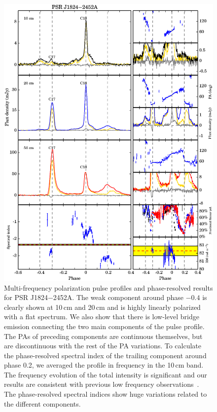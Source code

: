 \documentclass[useAMS,usenatbib]{mn2e}
\begin{document}
\begin{appendix}
\begin{figure}
\begin{center}
\includegraphics[width=6 in]{1824.ps}
\caption{Multi-frequency polarization pulse profiles and phase-resolved results for PSR J1824$-$2452A. 
The weak component around phase $-0.4$ is clearly shown at 10\,cm and 20\,cm and is highly 
linearly polarized with a flat spectrum. 
%
We also show that there is low-level bridge emission 
connecting the two main components of the pulse profile.
%
The PAs of preceding components are continuous themselves, but are 
discontinuous with the rest of the PA variations.
%
To calculate the phase-resolved spectral index of the trailing component
around phase 0.2, we averaged the profile in frequency in the 10\,cm 
band.
%
The frequency evolution of the total intensity is significant and 
our results are consistent with previous low frequency observations~\citep[e.g.,][]{Stairs99}.
The phase-resolved spectral indices show huge variations related to the 
different components. 
}
\label{1824}
\end{center}
\end{figure}


\end{appendix}
\end{document}

